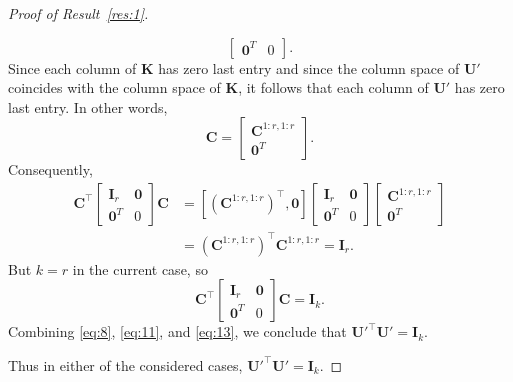 \documentclass[11pt,a4paper]{article}
\theoremstyle{mybreak}
\numberwithin{dummy}{section}
\theoremstyle{plain}
\theoremstyle{plain}
\theoremstyle{plain}
\theoremstyle{plain}
\theoremstyle{MyNonumberplain}
\newtheorem{proof}{Proof}
\newcommand{\0}{\M{0}}
\newcommand{\M}[1]{\mathbf{#1}}
\newcommand{\T}{\top}
\begin{document}
\begin{proof}[Proof of Result~\ref{res:1}]
\begin{enumerate}[font=\upshape,label=(\roman*),wide,align=right]
\begin{displaymath}
\begin{bmatrix}
        \0^T & 0
      \end{bmatrix}.
    \end{displaymath}
    Since each column of $\M{K}$ has zero last entry and since the column space of $\M{U}'$ coincides with the column space of $\M{K}$, it follows that each column of $\M{U}'$ has zero last entry. In other words,
    \begin{equation}
      \label{eq:12}
      \M{C}
      =
      \begin{bmatrix}
        \M{C}^{1:r, 1:r}
        \\
        \0^T
      \end{bmatrix}.
    \end{equation}
    Consequently,
    \begin{align*}
      \M{C}^\T
      \begin{bmatrix}
        \M{I}_r & \0 \\
        \0^T & 0
      \end{bmatrix}
               \M{C}
             & =
               [(\M{C}^{1:r, 1:r})^\T, \0]
               \begin{bmatrix}
                 \M{I}_r & \0 \\
                 \0^T & 0
               \end{bmatrix}
                        \begin{bmatrix}
                          \M{C}^{1:r, 1:r}
                          \\
                          \0^T
                        \end{bmatrix}
      \\
                & =
                  (\M{C}^{1:r, 1:r})^\T   \M{C}^{1:r, 1:r}
                  =
                  \M{I}_r.
    \end{align*} 
    But $k = r$ in the current case, so
    \begin{equation}
      \label{eq:13}
      \M{C}^\T
      \begin{bmatrix}
        \M{I}_r & \0 \\
        \0^T & 0
      \end{bmatrix}
      \M{C}
      = \M{I}_k.
    \end{equation}
    Combining \eqref{eq:8}, \eqref{eq:11}, and \eqref{eq:13}, we conclude that
    \begin{math}
      \M{U}'^\T \M{U'} = \M{I}_k.
    \end{math}
  \end{enumerate}
  Thus in either of the considered cases, 
  \begin{math}
    \M{U}'^\T \M{U'} = \M{I}_k.
  \end{math}
  

\end{proof}
\end{document}
